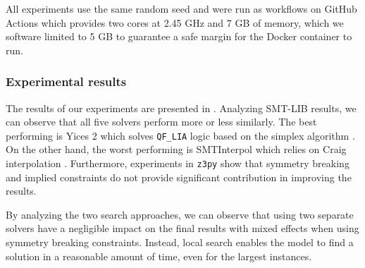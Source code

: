 All experiments use the same random seed and were run as workflows on GitHub Actions which provides two cores at 2.45 GHz and 7 GB of memory, which we software limited to 5 GB to guarantee a safe margin for the Docker container to run.


\subsubsection{Experimental results}

The results of our experiments are presented in .
Analyzing SMT-LIB results, we can observe that all five solvers perform more or less similarly. The best performing is Yices 2 which solves \texttt{QF\_LIA} logic based on the simplex algorithm \cite{yices2}. On the other hand, the worst performing is SMTInterpol which relies on Craig interpolation \cite{smtinterpol}.
Furthermore, experiments in \texttt{z3py} show that symmetry breaking and implied constraints do not provide significant contribution in improving the results.

By analyzing the two search approaches, we can observe that using two separate solvers have a negligible impact on the final results with mixed effects when using symmetry breaking constraints. Instead, local search enables the model to find a solution in a reasonable amount of time, even for the largest instances.

